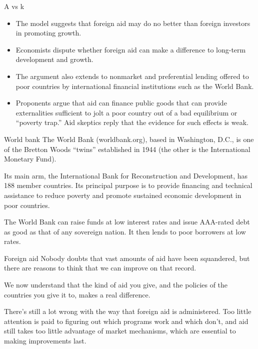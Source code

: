 \documentclass[
  ignorenonframetext,
]{beamer}
\providecommand{\tightlist}{%
  \setlength{\itemsep}{0pt}\setlength{\parskip}{0pt}}\usepackage{longtable,booktabs,array}
\begin{document}
\begin{frame}{A vs k}
\label{a-vs-k-7}
\begin{itemize}
\tightlist
\item
  The model suggests that foreign aid may do no better than foreign
  investors in promoting growth.
\item
  Economists dispute whether foreign aid can make a difference to
  long-term development and growth.
\item
  The argument also extends to nonmarket and preferential lending
  offered to poor countries by international financial institutions such
  as the World Bank.
\item
  Proponents argue that aid can finance public goods that can provide
  externalities sufficient to jolt a poor country out of a bad
  equilibrium or ``poverty trap.'' Aid skeptics reply that the evidence
  for such effects is weak.
\end{itemize}
\end{frame}

\begin{frame}{World bank}
\label{world-bank}
The World Bank (worldbank.org), based in Washington, D.C., is one of the
Bretton Woods ``twins'' established in 1944 (the other is the
International Monetary Fund).

Its main arm, the International Bank for Reconstruction and Development,
has 188 member countries. Its principal purpose is to provide financing
and technical assistance to reduce poverty and promote sustained
economic development in poor countries.

The World Bank can raise funds at low interest rates and issue AAA-rated
debt as good as that of any sovereign nation. It then lends to poor
borrowers at low rates.
\end{frame}

\begin{frame}{Foreign aid}
\label{foreign-aid}
Nobody doubts that vast amounts of aid have been squandered, but there
are reasons to think that we can improve on that record.

We now understand that the kind of aid you give, and the policies of the
countries you give it to, makes a real difference.

There's still a lot wrong with the way that foreign aid is administered.
Too little attention is paid to figuring out which programs work and
which don't, and aid still takes too little advantage of market
mechanisms, which are essential to making improvements last.
\end{frame}
\end{document}
